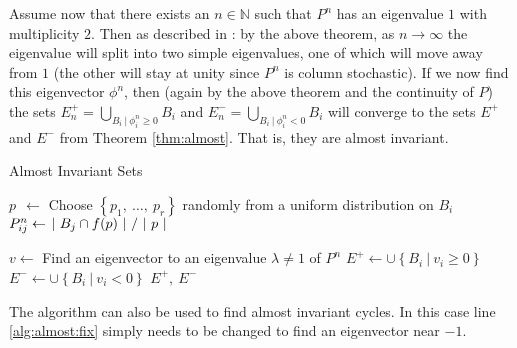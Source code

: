 Assume now that there exists an $n \in \mathbb{N}$ such that $P^n$ has an eigenvalue $1$ 
with multiplicity $2$. Then as described in \cite*{algGAIO}: by the above theorem, 
as $n \to \infty$ the eigenvalue will split into two simple eigenvalues, one of 
which will move away from $1$ (the other will stay at unity since $P^n$ is column 
stochastic). If we now find this eigenvector $\phi^n$, then (again by the above theorem 
and the continuity of $P$) the sets $E_n^+ = \bigcup_{B_i\ \vert\ \phi_i^n \geq 0} B_i$ 
and $E_n^- = \bigcup_{B_i\ \vert\ \phi_i^n < 0} B_i$ will converge to the sets $E^+$ and 
$E^-$ from Theorem \ref{thm:almost}. That is, they are almost invariant. 

\begin{algorithm}
    \caption{Almost Invariant Sets}
    \label{alg:almost}
    \begin{spacing}{1.2}
        \begin{algorithmic}[1]

                \State $p\ \ \gets $ Choose $\left\{ p_1,\ \ldots,\ p_r \right\}$ randomly from a uniform distribution on $B_i$
                \State $P_{ij}^n \gets \left. |\ B_j \cap f(p)\ | \ \middle/\ |\ p\ | \right.$
            \EndFor
    
            \State $v \gets $ Find an eigenvector to an eigenvalue $\lambda \neq 1$ of $P^n$
            \label{alg:almost:fix}
            \State $E^+ \gets \cup \left\{ B_i\ \vert\ v_i \geq 0 \right\}$
            \State $E^- \gets \cup \left\{ B_i\ \vert\ v_i < 0 \right\}$
            \State \Return $E^+,\ E^-$
        \end{algorithmic}
    \end{spacing}
\end{algorithm}

\begin{remark}
    The algorithm can also be used to find almost invariant cycles. In this case line 
    \ref{alg:almost:fix} simply needs to be changed to find an eigenvector near $-1$. \\
\end{remark} 

